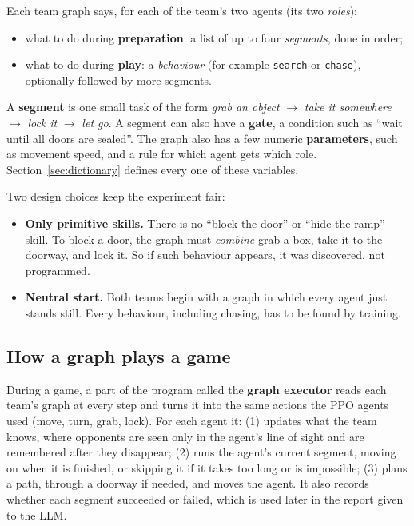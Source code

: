 \documentclass[11pt]{article}
\begin{document}
Each team graph says, for each of the team's two agents (its two
\emph{roles}):
\begin{itemize}
  \item what to do during \textbf{preparation}: a list of up to four
  \emph{segments}, done in order;
  \item what to do during \textbf{play}: a \emph{behaviour} (for example
  \texttt{search} or \texttt{chase}), optionally followed by more segments.
\end{itemize}
A \textbf{segment} is one small task of the form
\emph{grab an object} $\rightarrow$ \emph{take it somewhere} $\rightarrow$
\emph{lock it} $\rightarrow$ \emph{let go}. A segment can also have a
\textbf{gate}, a condition such as ``wait until all doors are sealed''. The graph
also has a few numeric \textbf{parameters}, such as movement speed, and a rule
for which agent gets which role. Section~\ref{sec:dictionary} defines every one
of these variables.

Two design choices keep the experiment fair:
\begin{itemize}
  \item \textbf{Only primitive skills.} There is no ``block the door'' or ``hide
  the ramp'' skill. To block a door, the graph must \emph{combine} grab a box,
  take it to the doorway, and lock it. So if such behaviour appears, it was
  discovered, not programmed.
  \item \textbf{Neutral start.} Both teams begin with a graph in which every agent
  just stands still. Every behaviour, including chasing, has to be found by
  training.
\end{itemize}

\subsection{How a graph plays a game}

During a game, a part of the program called the \textbf{graph executor} reads
each team's graph at every step and turns it into the same actions the PPO
agents used (move, turn, grab, lock). For each agent it:
(1) updates what the team knows, where opponents are seen only in the agent's
line of sight and are remembered after they disappear;
(2) runs the agent's current segment, moving on when it is finished, or skipping
it if it takes too long or is impossible;
(3) plans a path, through a doorway if needed, and moves the agent.
It also records whether each segment succeeded or failed, which is used later in
the report given to the LLM.
\end{document}
